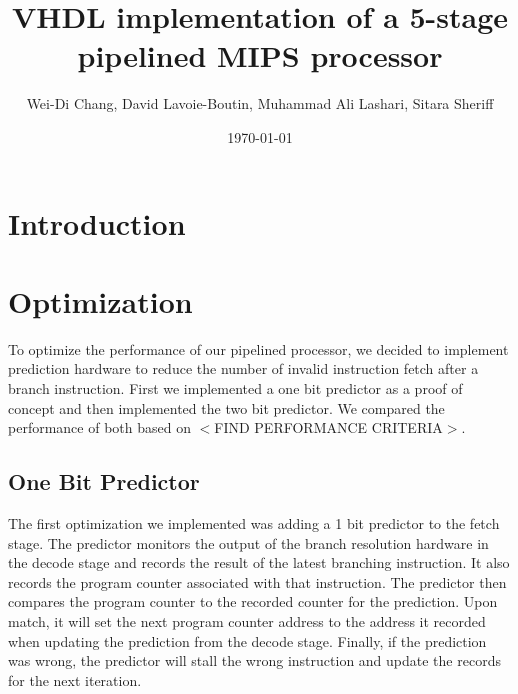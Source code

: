 \documentclass[12pt]{IEEEtran} %
\title{VHDL implementation of a 5-stage pipelined MIPS processor}
\date{\today}
\author{Wei-Di Chang, David Lavoie-Boutin, Muhammad Ali Lashari, Sitara Sheriff}
\begin{document}

\section{Introduction} %
\label{sec:introduction}

\section{Optimization} %
\label{sec:optimisation}
To optimize the performance of our pipelined processor, we decided to implement prediction hardware to reduce the number of invalid instruction fetch after a branch instruction. First we implemented a one bit predictor as a proof of concept and then implemented the two bit predictor. We compared the performance of both based on $<$FIND PERFORMANCE CRITERIA$>$.

\subsection{One Bit Predictor} %
\label{sec:1_bit_predictor}
The first optimization we implemented was adding a 1 bit predictor to the fetch stage. The predictor monitors the output of the branch resolution hardware in the decode stage and records the result of the latest branching instruction. It also records the program counter associated with that instruction. The predictor then compares the program counter to the recorded counter for the prediction. Upon match, it will set the next program counter address to the address it recorded when updating the prediction from the decode stage. Finally, if the prediction was wrong, the predictor will stall the wrong instruction and update the records for the next iteration.  
\end{document}
